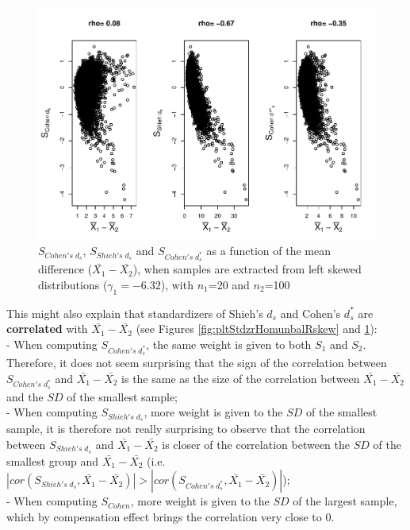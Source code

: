 \documentclass[
  english,
  man,mask]{apa6}
\begin{document}
\begin{figure}
\centering
\includegraphics{Correlation_files/figure-latex/pltStdzrHomunbalLskew-1.pdf}
\caption{\label{fig:pltStdzrHomunbalLskew}\(S_{Cohen's \; d_s}\), \(S_{Shieh's \; d_s}\) and \(S_{Cohen's \; d^*_s}\) as a function of the mean difference (\(\bar{X_1}-\bar{X_2}\)), when samples are extracted from left skewed distributions (\(\gamma_1 = -6.32\)), with \(n_1\)=20 and \(n_2\)=100}
\end{figure}

This might also explain that standardizers of Shieh's \(d_s\) and Cohen's \(d^*_s\) are \textbf{correlated} with \(\bar{X_1}-\bar{X_2}\) (see Figures \ref{fig:pltStdzrHomunbalRskew} and \ref{fig:pltStdzrHomunbalLskew}):\\
- When computing \(S_{Cohen's \; d^*_s}\), the same weight is given to both \(S_1\) and \(S_2\). Therefore, it does not seem surprising that the sign of the correlation between \(S_{Cohen's \; d^*_s}\) and \(\bar{X_1}-\bar{X_2}\) is the same as the size of the correlation between \(\bar{X_1}-\bar{X_2}\) and the \(SD\) of the smallest sample;\\
- When computing \(S_{Shieh's \; d_s}\), more weight is given to the \(SD\) of the smallest sample, it is therefore not really surprising to observe that the correlation between \(S_{Shieh's \; d_s}\) and \(\bar{X_1}-\bar{X_2}\) is closer of the correlation between the \(SD\) of the smallest group and \(\bar{X_1}-\bar{X_2}\) (i.e.~\(|cor(S_{Shieh's \; d_s},\bar{X_1}-\bar{X_2})| > |cor(S_{Cohen's \; d^*_s},\bar{X_1}-\bar{X_2})|\));\\
- When computing \(S_{Cohen}\), more weight is given to the \(SD\) of the largest sample, which by compensation effect brings the correlation very close to 0.
\end{document}
